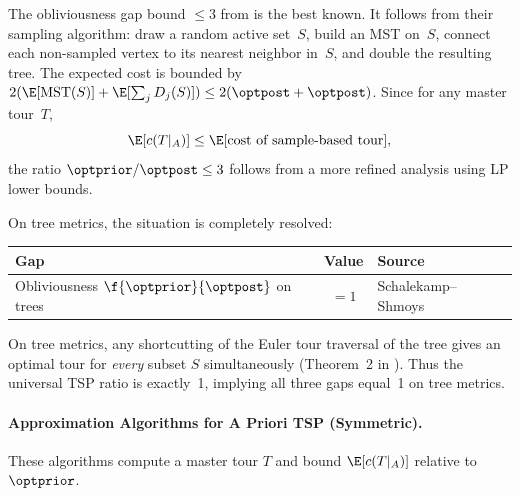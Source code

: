 \begin{remark}
    The obliviousness gap bound $\le 3$ from \cite{Shmoys2008} is the best known.
    It follows from their sampling algorithm: draw a random active set~$S$,
    build an MST on~$S$,
    connect each non-sampled vertex to its nearest neighbor in~$S$,
    and double the resulting tree.
    The expected cost is bounded by
    $2(\E[\text{MST}(S)] + \E[\sum_j D_j(S)])
    \le 2(\optpost + \optpost)$.
    Since for any master tour~$T$,
    \[
        \E[c(T|_A)] \le \E[\text{cost of sample-based tour}],
    \]
    the ratio $\optprior / \optpost \le 3$ follows from a
    more refined analysis using LP lower bounds.
\end{remark}

On tree metrics, the situation is completely resolved:

\begin{center}
\renewcommand{\arraystretch}{1.4}
\begin{tabular}{l c l}
    \hline
    \textbf{Gap} & \textbf{Value} & \textbf{Source} \\
    \hline
    Obliviousness $\f{\optprior}{\optpost}$ on trees & $= 1$ & Schalekamp--Shmoys~\cite{SchalekampShmoys2008} \\
    \hline
\end{tabular}
\end{center}

\begin{remark}
    On tree metrics, any shortcutting of the Euler tour traversal of the tree gives an optimal tour for \emph{every} subset $S$ simultaneously (Theorem~2 in \cite{SchalekampShmoys2008}). Thus the universal TSP ratio is exactly~1, implying all three gaps equal~1 on tree metrics.
\end{remark}

\paragraph{Approximation Algorithms for A Priori TSP (Symmetric).}

These algorithms compute a master tour $T$ and bound $\E[c(T|_A)]$ relative to $\optprior$.

